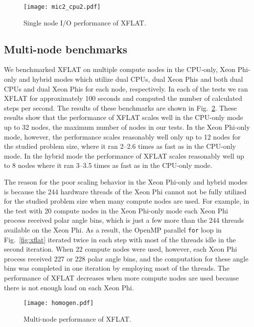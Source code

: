 \documentclass{sig-alternate}
\begin{document}
\begin{figure}
\centering
\texttt{[image: mic2\_cpu2.pdf]}
\caption{Single node I/O performance of XFLAT.}
\label{fig:io}
\end{figure}



\subsection{Multi-node benchmarks}

We benchmarked XFLAT on multiple compute nodes in the CPU-only, Xeon
Phi-only and hybrid modes which utilize dual CPUs, dual
Xeon Phis and both dual CPUs and dual Xeon Phis for each node, respectively. 
In each of the tests we ran XFLAT for approximately 100 seconds and
computed the number of calculated steps per second. The
results of these benchmarks are shown in Fig.~\ref{fig:hom}.
These results show that the performance of XFLAT scales well in the CPU-only
mode up to 32 nodes, the maximum number of nodes in our
tests. In the Xeon Phi-only mode, however, the performance
scales reasonably well only up to 
12 nodes for the studied problem size, where it
ran 2--2.6 times as fast as in the CPU-only mode. 
In the hybrid mode the performance of
XFLAT scales reasonably well up to 8 nodes where it ran 3--3.5 times as
fast as in the CPU-only mode.

The reason for the poor scaling behavior in the Xeon Phi-only and
hybrid modes is 
because the 244 hardware threads of the Xeon Phi cannot not be fully
utilized for the studied problem size when many compute nodes are used.
For example, in the test with 20 compute nodes in the Xeon Phi-only mode
each Xeon Phi process received
 polar angle bins, which is just a few more than the
244 threads available on the Xeon Phi. As a result, the OpenMP parallel
\texttt{for} loop in 
Fig.~\ref{fig:xflat} iterated twice in each step with most of the
threads idle in the second iteration. 
When 22 compute nodes were used, however, each Xeon Phi process received
227 or 228 polar angle bins, and the computation for these angle bins
was completed in one iteration by employing most of the
threads. The performance of XFLAT decreases when more compute nodes
are used because there is not enough load on each Xeon Phi.


\begin{figure}[t]
\centering
\texttt{[image: homogen.pdf]}
\caption{Multi-node performance of XFLAT.}
\label{fig:hom}
\end{figure}
\end{document}
